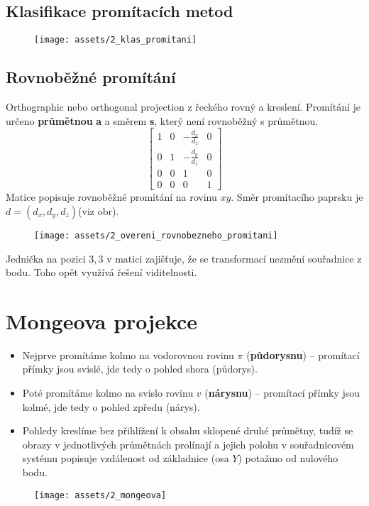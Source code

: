 \subsection{Klasifikace promítacích metod}
\begin{figure}[H]
    \centering
    \texttt{[image: assets/2\_klas\_promitani]}
\end{figure}

\subsection{Rovnoběžné promítání}
Orthographic nebo orthogonal projection z řeckého  rovný a  kreslení. Promítání je určeno \textbf{průmětnou} \textbf{a} a směrem \textbf{s}, který není rovnoběžný s průmětnou.
\begin{equation*}
    \begin{bmatrix}
        1 & 0 & -\frac{d_x}{d_z} & 0 \\[0.3em]
        0 & 1 & -\frac{d_y}{d_z} & 0 \\[0.3em]
        0 & 0 & 1                & 0 \\[0.3em]
        0 & 0 & 0                & 1
    \end{bmatrix}
\end{equation*}
Matice popisuje rovnoběžné promítání na rovinu $xy$. Směr promítacího paprsku je $d = (d_x, d_y, d_z)$(viz obr).
\begin{figure}[H]
    \centering
    \texttt{[image: assets/2\_overeni\_rovnobezneho\_promitani]}
\end{figure}
Jednička na pozici $3,3$ v matici zajišťuje, že se transformací nezmění souřadnice z bodu. Toho opět využívá řešení viditelnosti.

\section{Mongeova projekce}
\begin{itemize}
    \item Nejprve promítáme kolmo na vodorovnou rovinu $\pi$ (\textbf{půdorysnu}) -- promítací přímky jsou svislé, jde tedy o pohled shora (půdorys).
    \item Poté promítáme kolmo na svislo rovinu $v$ (\textbf{nárysnu}) -- promítací přímky jsou kolmé, jde tedy o pohled zpředu (nárys).
    \item Pohledy kreslíme bez přihlížení k obsahu sklopené druhé průmětny, tudíž se obrazy v jednotlivých průmětnách prolínají a jejich polohu v souřadnicovém systému popisuje vzdálenost od základnice (osa $Y$) potažmo od nulového bodu.
\end{itemize}
\begin{figure}[H]
    \centering
    \texttt{[image: assets/2\_mongeova]}
\end{figure}

